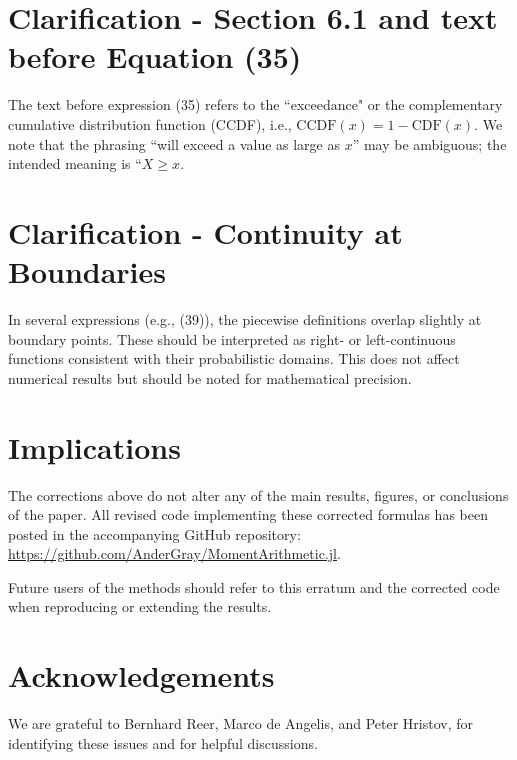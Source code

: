 \documentclass{article}
\begin{document}
\section{Clarification - Section 6.1 and text before Equation (35)}
The text before expression (35) refers to the ``exceedance" or the complementary cumulative distribution function (CCDF), i.e., $\text{CCDF}(x) = 1 - \text{CDF}(x)$.
We note that the phrasing “will exceed a value as large as $x$” may be ambiguous; the intended meaning is ``$X \geq x$.

\section{Clarification - Continuity at Boundaries}
In several expressions (e.g., (39)), the piecewise definitions overlap slightly at boundary points. These should be interpreted as right- or left-continuous functions consistent with their probabilistic domains. This does not affect numerical results but should be noted for mathematical precision.

\section{Implications}
The corrections above do not alter any of the main results, figures, or conclusions of the paper. All revised code implementing these corrected formulas has been posted in the accompanying GitHub repository: \href{https://github.com/AnderGray/MomentArithmetic.jl}{https://github.com/AnderGray/MomentArithmetic.jl}.

Future users of the methods should refer to this erratum and the corrected code when reproducing or extending the results.

\section{Acknowledgements}
We are grateful to Bernhard Reer, Marco de Angelis, and Peter Hristov, for identifying these issues and for helpful discussions.



\end{document}
